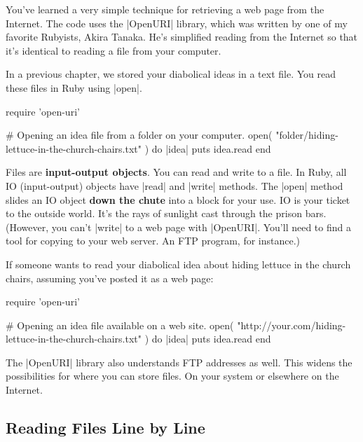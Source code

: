 \documentclass[12pt,twoside]{report}
\begin{document}
You've learned a very simple technique for retrieving a web page from
the Internet.  The code uses the \rubyinline|OpenURI|
library, which was written by one of my favorite Rubyists, Akira
Tanaka.  He's simplified reading from the Internet so that it's
identical to reading a file from your computer.

In a previous chapter, we stored your diabolical ideas in a text file.
You read these files in Ruby using \rubyinline|open|.


\begin{rubycode}

 require 'open-uri'

 # Opening an idea file from a folder on your computer.
 open( "folder/hiding-lettuce-in-the-church-chairs.txt" ) do |idea|
   puts idea.read
 end

\end{rubycode}


Files are {\bf input-output objects}.  You can read and write to a
file.  In Ruby, all IO (input-output) objects have
\rubyinline|read| and
\rubyinline|write| methods.  The
\rubyinline|open| method slides an IO object {\bf down
  the chute} into a block for your use.  IO is your ticket to the
outside world.  It's the rays of sunlight cast through the prison
bars.  (However, you can't \rubyinline|write| to a web
page with \rubyinline|OpenURI|.  You'll need to find a
tool for copying to your web server.  An FTP program, for instance.)

If someone wants to read your diabolical idea about hiding lettuce in
the church chairs, assuming you've posted it as a web page:


\begin{rubycode}

 require 'open-uri'

 # Opening an idea file available on a web site.
 open( "http://your.com/hiding-lettuce-in-the-church-chairs.txt" ) do |idea|
   puts idea.read
 end

\end{rubycode}


The \rubyinline|OpenURI| library also understands FTP
addresses as well.  This widens the possibilities for where you can
store files.  On your system or elsewhere on the Internet.



\subsection{Reading Files Line by Line}
\end{document}

